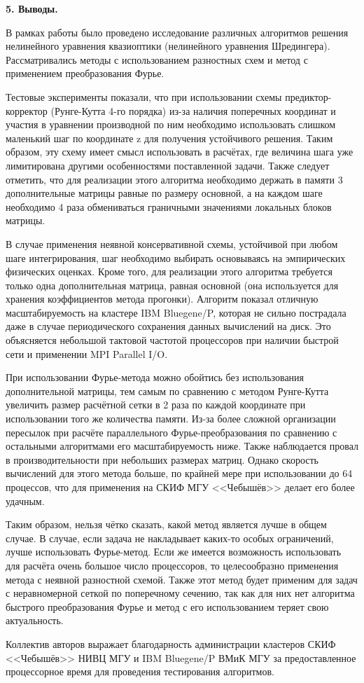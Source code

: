 \vspace{1em}
\noindent \textbf{5. Выводы.}
\vspace{0.5em}

В рамках работы было проведено исследование различных алгоритмов решения нелинейного уравнения квазиоптики (нелинейного уравнения Шредингера).
Рассматривались методы с использованием разностных схем и метод с применением преобразования Фурье.

Тестовые эксперименты показали, что при использовании схемы предиктор-корректор (Рунге-Кутта 4-го порядка)
из-за наличия поперечных координат и участия в уравнении производной по ним необходимо
использовать слишком маленький шаг по координате z для получения устойчивого решения.
Таким образом, эту схему имеет смысл использовать в расчётах, где величина шага уже лимитирована
другими особенностями поставленной задачи. Также следует отметить, что для реализации этого алгоритма
необходимо держать в памяти 3 дополнительные матрицы равные по размеру основной,
а на каждом шаге необходимо 4 раза обмениваться граничными значениями локальных блоков матрицы.

В случае применения неявной консервативной схемы, устойчивой при любом шаге интегрирования,
шаг необходимо выбирать основываясь на эмпирических физических оценках.
Кроме того, для реализации этого алгоритма требуется только одна дополнительная матрица,
равная основной (она используется для хранения коэффициентов метода прогонки).
Алгоритм показал отличную масштабируемость на кластере IBM Bluegene/P,
которая не сильно пострадала даже в случае периодического сохранения данных вычислений на диск.
Это объясняется небольшой тактовой частотой процессоров при наличии быстрой сети и применении MPI Parallel I/O.

При использовании Фурье-метода можно обойтись без использования дополнительной матрицы,
тем самым по сравнению с методом Рунге-Кутта увеличить размер расчётной сетки в 2 раза
по каждой координате при использовании того же количества памяти.
Из-за более сложной организации пересылок при расчёте параллельного Фурье-преобразования
по сравнению с остальными алгоритмами его масштабируемость ниже.
Также наблюдается провал в производительности при небольших размерах матриц.
Однако скорость вычислений для этого метода больше, по крайней мере при использовании до 64 процессов,
что для применения на СКИФ МГУ <<Чебышёв>> делает его более удачным.

Таким образом, нельзя чётко сказать, какой метод является лучше в общем случае.
В случае, если задача не накладывает каких-то особых ограничений, лучше использовать Фурье-метод.
Если же имеется возможность использовать для расчёта очень большое число процессоров,
то целесообразно применения метода с неявной разностной схемой. Также этот метод будет применим
для задач с неравномерной сеткой по поперечному сечению, так как для них нет алгоритма
быстрого преобразования Фурье и метод с его использованием теряет свою актуальность.

Коллектив авторов выражает благодарность администрации кластеров СКИФ <<Чебышёв>> НИВЦ МГУ и IBM Bluegene/P ВМиК МГУ
за предоставленное процессорное время для проведения тестирования алгоритмов.
